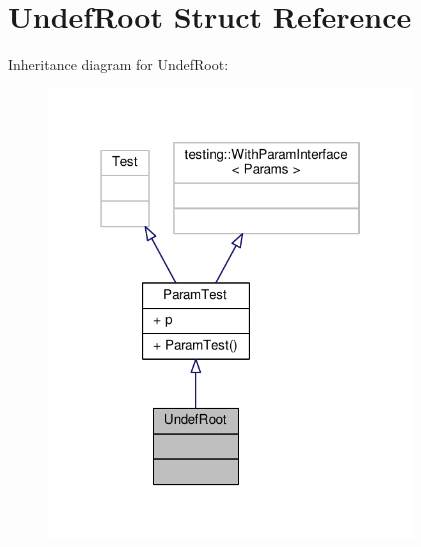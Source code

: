 \hypertarget{struct_undef_root}{}\section{Undef\+Root Struct Reference}
\label{struct_undef_root}


Inheritance diagram for Undef\+Root\+:
\nopagebreak
\begin{figure}[H]
\begin{center}
\leavevmode
\includegraphics[width=274pt]{struct_undef_root__inherit__graph}
\end{center}
\end{figure}


